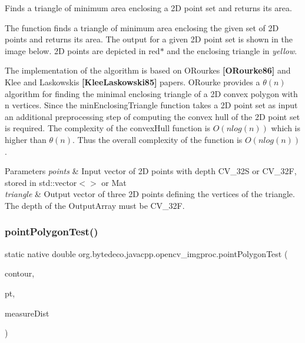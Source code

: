 Finds a triangle of minimum area enclosing a 2D point set and returns its area. 

The function finds a triangle of minimum area enclosing the given set of 2D points and returns its area. The output for a given 2D point set is shown in the image below. 2D points are depicted in red$\ast$ and the enclosing triangle in {\itshape yellow}. 

 

The implementation of the algorithm is based on O\textquotesingle{}Rourke\textquotesingle{}s {\bfseries [O\+Rourke86]} and Klee and Laskowski\textquotesingle{}s {\bfseries [Klee\+Laskowski85]} papers. O\textquotesingle{}Rourke provides a $\theta(n)$ algorithm for finding the minimal enclosing triangle of a 2D convex polygon with n vertices. Since the min\+Enclosing\+Triangle function takes a 2D point set as input an additional preprocessing step of computing the convex hull of the 2D point set is required. The complexity of the convex\+Hull function is $O(n log(n))$ which is higher than $\theta(n)$. Thus the overall complexity of the function is $O(n log(n))$. 


\begin{DoxyParams}{Parameters}
{\em points} & Input vector of 2D points with depth C\+V\+\_\+32S or C\+V\+\_\+32F, stored in std\+::vector$<$$>$ or Mat \\
\hline
{\em triangle} & Output vector of three 2D points defining the vertices of the triangle. The depth of the Output\+Array must be C\+V\+\_\+32F. \\
\hline
\end{DoxyParams}
\mbox{\label{group__imgproc__shape_gaf6f02003be04d7a37eff3af25946ff77}} 
\subsubsection{\texorpdfstring{point\+Polygon\+Test()}{pointPolygonTest()}}
{\footnotesize\ttfamily static native double org.\+bytedeco.\+javacpp.\+opencv\+\_\+imgproc.\+point\+Polygon\+Test (\begin{DoxyParamCaption}\item[{@By\+Val Mat}]{contour,  }\item[{@By\+Val Point2f}]{pt,  }\item[{@Cast(\char`\"{}bool\char`\"{}) boolean}]{measure\+Dist }\end{DoxyParamCaption})\hspace{0.3cm}{\ttfamily [static]}}



